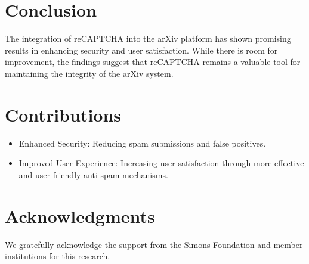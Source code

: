 \documentclass{article}
\begin{document}
\section{Conclusion}
The integration of reCAPTCHA into the arXiv platform has shown promising results in enhancing security and user satisfaction. While there is room for improvement, the findings suggest that reCAPTCHA remains a valuable tool for maintaining the integrity of the arXiv system.

\section{Contributions}
\begin{itemize}
\item Enhanced Security: Reducing spam submissions and false positives.
\item Improved User Experience: Increasing user satisfaction through more effective and user-friendly anti-spam mechanisms.
\end{itemize}

\section{Acknowledgments}
We gratefully acknowledge the support from the Simons Foundation and member institutions for this research.



\end{document}
